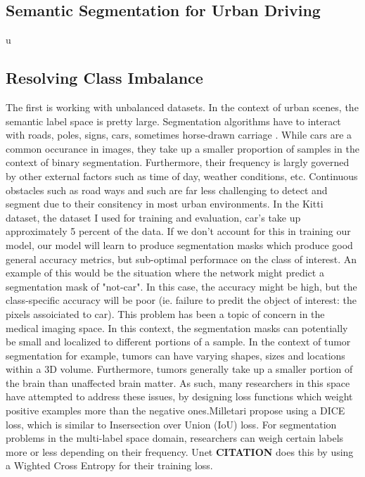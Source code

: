 \documentclass[Location Location Location! : Exploring Image Segmentation Problem In Urban Driving Scenarios]{IEEEtran}
\begin{document}
\subsection{Semantic Segmentation for Urban Driving}

	u

\subsection{Resolving Class Imbalance}
The first is working with unbalanced datasets. In the context of urban scenes, the semantic label space is pretty large. Segmentation algorithms have to interact with roads, poles, signs, cars, sometimes horse-drawn carriage \cite{b2}. While cars are a common occurance in images, they take up a smaller proportion of samples in the context of binary segmentation. Furthermore, their frequency is largly governed by other external factors such as time of day, weather conditions, etc. Continuous obstacles such as road ways and such are far less challenging to detect and segment due to their consitency in most urban environments. In the Kitti dataset, the dataset I used for training and evaluation, car's take up approximately 5 percent of the data. If we don't account for this in training our model, our model will learn to produce segmentation masks which produce good general accuracy metrics, but sub-optimal performace on the class of interest. An example of this would be the situation where the network might predict a segmentation mask of "not-car". In this case, the accuracy might be high, but the class-specific accuracy will be poor (ie. failure to predit the object of interest: the pixels assoiciated to car). This problem has been a topic of concern in the medical imaging space. In this context, the segmentation masks can potentially be small and localized to different portions of a sample. In the context of tumor segmentation for example, tumors can have varying shapes, sizes and locations within a 3D volume. Furthermore, tumors generally take up a smaller portion of the brain than unaffected brain matter. As such, many researchers in this space have attempted to address these issues, by designing loss functions which weight positive examples more than the negative ones.Milletari \cite{b1} propose using a DICE loss, which is similar to Insersection over Union (IoU) loss. For segmentation problems in the multi-label space domain, researchers can weigh certain labels more or less depending on their frequency. Unet  \textbf{CITATION} does this by using a Wighted Cross Entropy for their training loss. 
\end{document}
